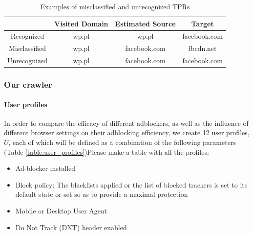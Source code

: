 \documentclass{sig-alternate}
\begin{document}
\begin{table}
\centering
\small
\label{table:false_positive_examples}
\begin{tabular}{|c|c c c|}
\hline
& Visited Domain & Estimated Source & Target \\
\hline
Recognized & wp.pl & wp.pl & facebook.com \\
Misclassified & wp.pl & facebook.com & fbcdn.net \\
Unrecognized & wp.pl & facebook.com & facebook.com \\
\hline
\end{tabular}
\caption{Examples of misclassified and unrecognized TPRs}
\end{table}

\subsubsection{Our crawler}
\paragraph{User profiles}
In order to compare the efficacy of different adblockers, as well as the influence of different browser settings on their adblocking efficiency, we create 12 user profiles, $U$, each of which will be defined as a combination of the following parameters (Table \ref{table:user_profiles}){\color{red}Please make a table with all the profiles}:

\begin{itemize}
 \item Ad-blocker installed
 \item Block policy: The blacklists applied or the list of blocked trackers is set to its default state or set so as to provide a maximal protection
 \item Mobile or Desktop User Agent
 \item Do Not Track (DNT) header enabled
\end{itemize}
\end{document}
